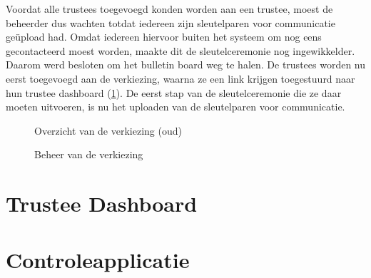 \npar Voordat alle trustees toegevoegd konden worden aan een trustee, moest de beheerder dus wachten totdat iedereen zijn sleutelparen voor communicatie ge\"upload had. Omdat iedereen hiervoor buiten het systeem om nog eens gecontacteerd moest worden, maakte dit de sleutelceremonie nog ingewikkelder. Daarom werd besloten om het bulletin board weg te halen. De trustees worden nu eerst toegevoegd aan de verkiezing, waarna ze een link krijgen toegestuurd naar hun trustee dashboard (\ref{sec:ui:trustee_dashboard}). De eerst stap van de sleutelceremonie die ze daar moeten uitvoeren, is nu het uploaden van de sleutelparen voor communicatie.

\begin{figure}
  \caption{Overzicht van de verkiezing (oud)}
  \label{fig:kv:elections_view_old}
\end{figure}

\begin{figure}
  \caption{Beheer van de verkiezing}
  \label{fig:kv:elections_admin}
\end{figure}

\section{Trustee Dashboard}
\label{sec:ui:trustee_dashboard}



\section{Controleapplicatie}
\label{sec:ui:controleapplicatie}
